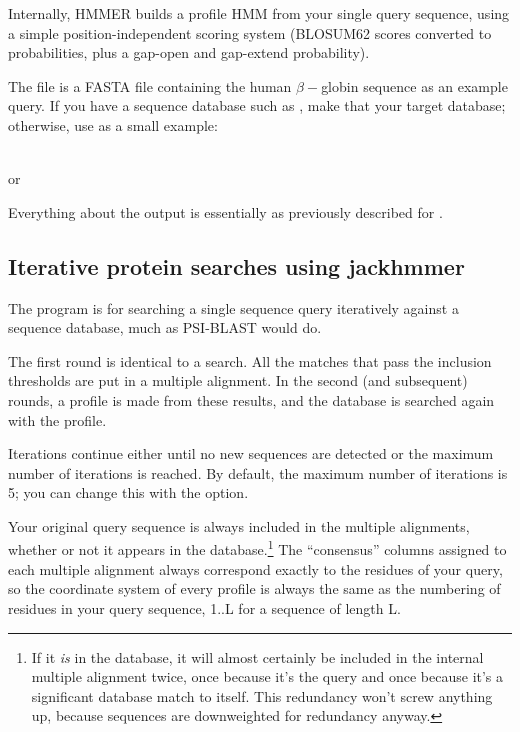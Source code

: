Internally, HMMER builds a profile HMM from your single query
sequence, using a simple position-independent scoring system (BLOSUM62
scores converted to probabilities, plus a gap-open and gap-extend
probability).

The file  is a FASTA file containing the
human $\beta-$globin sequence as an example query. If you have a
sequence database such as , make that your
target database; otherwise, use  as a
small example:

\\
or\\

Everything about the output is essentially as previously described for
. 


\subsection{Iterative protein searches using jackhmmer}

The  program is for searching a single sequence query
iteratively against a sequence database, much as PSI-BLAST would do.

The first round is identical to a  search. All the
matches that pass the inclusion thresholds are put in a multiple
alignment. In the second (and subsequent) rounds, a profile is made
from these results, and the database is searched again with the
profile.

Iterations continue either until no new sequences are detected or the
maximum number of iterations is reached. By default, the maximum
number of iterations is 5; you can change this with the 
option.

Your original query sequence is always included in the multiple
alignments, whether or not it appears in the database.\footnote{If it
  \emph{is} in the database, it will almost certainly be included in
  the internal multiple alignment twice, once because it's the query
  and once because it's a significant database match to itself. This
  redundancy won't screw anything up, because sequences are
  downweighted for redundancy anyway.}  
The ``consensus'' columns assigned to each multiple alignment always
correspond exactly to the residues of your query, so the coordinate
system of every profile is always the same as the numbering of
residues in your query sequence, 1..L for a sequence of length L.

